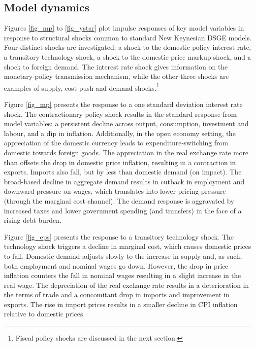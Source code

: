 \documentclass[a4paper,11pt]{article}
\numberwithin{equation}{section}
\begin{document}

	
	\subsection{Model dynamics}
	
	Figures \ref{fig_mp} to \ref{fig_ystar} plot impulse responses of key model variables in response to structural shocks common to standard New Keynesian DSGE models. Four distinct shocks are investigated: a shock to the domestic policy interest rate, a transitory technology shock, a shock to the domestic price markup shock, and a shock to foreign demand. The interest rate shock gives information on the monetary policy transmission mechanism, while the other three shocks are examples of supply, cost-push and demand shocks.\footnote{Fiscal policy shocks are discussed in the next section.} 
	
	Figure \ref{fig_mp} presents the response to a one standard deviation interest rate shock. The contractionary policy shock results in the standard response from model variables: a persistent decline across output, consumption, investment and labour, and a dip in inflation. Additionally, in the open economy setting, the appreciation of the domestic currency leads to expenditure-switching from domestic towards foreign goods. The appreciation in the real exchange rate more than offsets the drop in domestic price inflation, resulting in a contraction in exports. Imports also fall, but by less than domestic demand (on impact). The broad-based decline in aggregate demand results in cutback in employment and downward pressure on wages, which translates into lower pricing pressure (through the marginal cost channel). The demand response is aggravated by increased taxes and lower government spending (and transfers) in the face of a rising debt burden. 
	
	Figure \ref{fig_eps} presents the response to a transitory technology shock. The technology shock triggers a decline in marginal cost, which causes domestic prices to fall. Domestic demand adjusts slowly to the increase in supply and, as such, both employment and nominal wages go down. However, the drop in price inflation counters the fall in nominal wages resulting in a slight increase in the real wage. The depreciation of the real exchange rate results in a deterioration in the terms of trade and a concomitant drop in imports and improvement in exports. The rise in import prices results in a smaller decline in CPI inflation relative to domestic prices.
	
\end{document}
